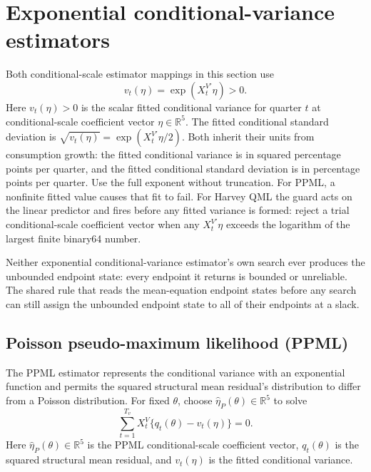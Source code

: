 \documentclass[11pt]{article}
\begin{document}
\section{Exponential conditional-variance estimators}
\label{sec:expcondvar}

Both conditional-scale estimator mappings in this section use
\begin{equation*}
 v_t(\eta)=\exp(X_t^{V\prime}\eta)>0.
\end{equation*}
Here \(v_t(\eta)>0\) is the scalar fitted conditional variance for quarter \(t\) at
conditional-scale coefficient vector \(\eta\in\mathbb R^5\). The fitted conditional standard
deviation is \(\sqrt{v_t(\eta)}=\exp(X_t^{V\prime}\eta/2)\). Both inherit their units from
consumption growth: the fitted conditional variance is in squared percentage points per quarter, and
the fitted conditional standard deviation is in percentage points per quarter. Use the full exponent without truncation. For PPML, a
nonfinite fitted value causes that fit to fail. For Harvey QML the guard acts on the linear
predictor and fires before any fitted variance is formed: reject a trial conditional-scale
coefficient vector when any \(X_t^{V\prime}\eta\) exceeds the logarithm of the largest finite
binary64 number.

Neither exponential conditional-variance estimator's own search ever produces the unbounded endpoint
state: every endpoint it returns is bounded or unreliable. The shared rule that reads the
mean-equation endpoint states before any search can still assign the unbounded endpoint state to all of their
endpoints at a slack.

\subsection{Poisson pseudo-maximum likelihood (PPML)}

The PPML estimator represents the conditional variance with an exponential function and permits the
squared structural mean residual's distribution to differ from a Poisson distribution.
For fixed \(\theta\), choose \(\widehat\eta_P(\theta)\in\mathbb R^5\) to solve
\begin{equation*}
 \sum_{t=1}^{T_v}X_t^V\{q_t(\theta)-v_t(\eta)\}=0.
\end{equation*}
Here \(\widehat\eta_P(\theta)\in\mathbb R^5\) is the PPML conditional-scale coefficient vector,
\(q_t(\theta)\) is the squared structural mean residual, and \(v_t(\eta)\) is the fitted conditional
variance.
\end{document}
